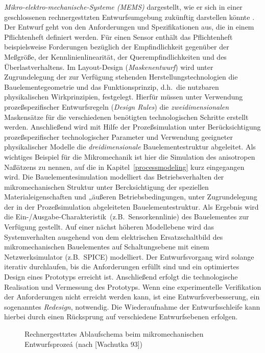 {\em Mikro-elektro-mechanische-Systeme (MEMS)}
dargestellt, wie er sich in einer geschlossenen rechnergesttzten
Entwurfsumgebung zukünftig darstellen könnte \cite{Wac93}.
Der Entwurf geht von
den Anforderungen und Spezifikationen aus, die in einem Pflichtenheft
definiert werden. Für einen Sensor enthält das Pflichtenheft
beispielsweise Forderungen bezüglich der Empfindlichkeit gegenüber der
Meßgröße, der Kennlinienlinearität, der Querempfindlichkeiten und des
Überlastverhaltens. Im Layout-Design ({\sl Maskenentwurf}) wird unter
Zugrundelegung der zur Verfügung stehenden Herstellungstechnologien die
Bauelementegeometrie und das Funktionsprinzip, d.h.\ die nutzbaren
physikalischen Wirkprinzipien, festgelegt. Hierfür müssen unter Verwendung
prozeßspezifischer Entwurfsregeln ({\sl Design Rules}) die
{\em zweidimensionalen}
Maskensätze für die verschiedenen benötigten technologischen Schritte
erstellt werden.
%
Anschließend wird mit Hilfe der Prozeßsimulation unter Berücksichtigung
prozeßspezifischer technologischer Parameter und Verwendung geeigneter
physikalischer Modelle die {\em dreidimensionale} Bauelementestruktur
abgeleitet. Als wichtiges Beispiel für die Mikromechanik ist hier die
Simulation des anisotropen Naßätzens zu nennen, auf die in
Kapitel~\ref{processmodeling} kurz eingegangen wird.
%
Die Bauelementesimulation modelliert das Betriebsverhalten
der mikromechanischen Struktur unter Bercksichtigung der speziellen
Materialeigenschaften und „äußeren Betriebsbedingungen, unter Zugrundelegung
der in der Prozeßsimulation abgeleiteten Bauelementestruktur. Als Ergebnis
wird die \glqq Ein-/Ausgabe-Charakteristik\grqq \, (z.B.\ Sensorkennlinie)
des Bauelementes zur Verfügung gestellt.
%
Auf einer nächst höheren Modellebene wird das Systemverhalten ausgehend von
dem elektrischen Ersatzschaltbild des mikromechanischen Bauelementes auf
Schaltungsebene mit einem Netzwerksimulator (z.B.\ {\sf SPICE})
modelliert. Der Entwurfsvorgang wird solange iterativ durchlaufen, bis
die Anforderungen erfüllt sind und ein optimiertes Design eines
Prototyps erreicht ist. Anschließend erfolgt die technologische
Realisation und Vermessung des Prototyps. Wenn eine experimentelle
Verifikation der Anforderungen nicht erreicht werden kann, ist eine
Entwurfsverbesserung, ein sogenanntes {\em Redesign}, notwendig. Die
Wiederaufnahme der Entwurfsschleife kann hierbei durch einen Rücksprung
auf verschiedene Entwurfsebenen erfolgen.
\begin{figure}[htb]
\begin{center}

\setabbee
\end{center}
\caption{\label{abbmems}
 Rechnergesttztes Ablaufschema beim mikromechanischen Entwurfsprozeá
 (nach [Wachutka 93])}
\end{figure}

